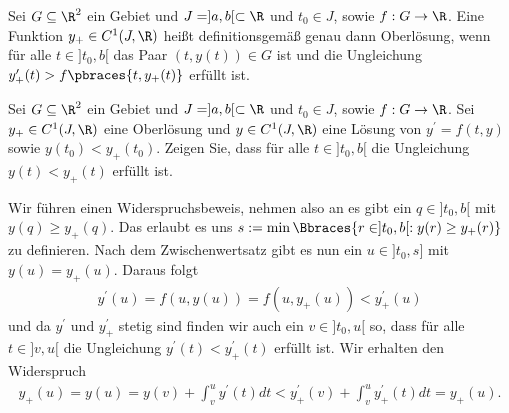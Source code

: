 \begin{definition}
    Sei $G \subseteq \R^2$ ein Gebiet und $J = ]a, b[ \subset \R$ und $t_0 \in J$, sowie $f: G \to \R$. Eine Funktion $y_+ \in C^1(J, \R)$ heißt definitionsgemäß genau dann Oberlösung, wenn für alle $t \in ]t_0, b[$ das Paar $(t, y(t)) \in G$ ist und die Ungleichung $y_+^\prime(t) > f\pbraces{t, y_+(t)}$ erfüllt ist.
\end{definition}

\begin{exercise}
    Sei $G \subseteq \R^2$ ein Gebiet und $J = ]a, b[ \subset \R$ und $t_0 \in J$, sowie $f: G \to \R$. Sei $y_+ \in C^1(J, \R)$ eine Oberlösung und $y \in C^1(J, \R)$ eine Lösung von $y^\prime = f(t,y)$ sowie $y(t_0) < y_+(t_0)$. Zeigen Sie, dass für alle $t \in ]t_0, b[$ die Ungleichung $y(t) < y_+(t)$ erfüllt ist.
\end{exercise}

\begin{solution}
    Wir führen einen Widerspruchsbeweis, nehmen also an es gibt ein $q \in ]t_0, b[$ mit $y(q) \geq y_+(q)$. Das erlaubt es uns $s := \min\Bbraces{r \in ]t_0, b[ : y(r) \geq y_+(r)}$ zu definieren. Nach dem Zwischenwertsatz gibt es nun ein $u \in ]t_0, s]$ mit $y(u) = y_+(u)$. Daraus folgt
    \begin{align*}
        y^\prime(u) = f(u, y(u)) = f(u, y_+(u)) < y_+^\prime(u)
    \end{align*}
    und da $y^\prime$ und $y_+^\prime$ stetig sind finden wir auch ein $v \in ]t_0, u[$ so, dass für alle $t \in ]v, u[$ die Ungleichung $y^\prime(t) < y_+^\prime(t)$ erfüllt ist. Wir erhalten den Widerspruch
    \begin{align*}
       y_+(u) = y(u) = y(v) + \int_v^u y^\prime(t) dt < y_+^\prime(v) + \int_v^u y_+^\prime(t) dt = y_+(u).
    \end{align*}
\end{solution}
